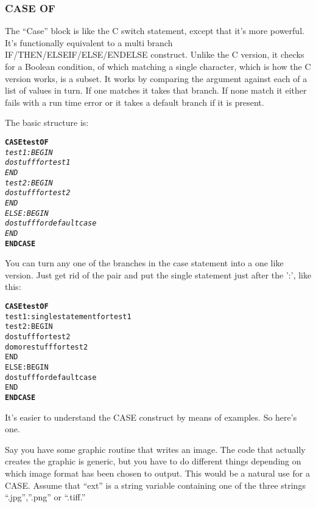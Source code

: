   \subsubsection{CASE OF}\label{sec:qs-Case-Of}

        The ``Case'' block is like the C switch statement, except that
        it's more powerful. It's functionally equivalent to a multi
        branch IF/THEN/ELSEIF/ELSE/ENDELSE construct. Unlike the C
        version, it checks for a Boolean condition, of which matching
        a single character, which is how the C version works, is a
        subset. It works by comparing the argument against each of a
        list of values in turn. If one matches it takes that
        branch. If none match it either fails with a run time error or
        it takes a default branch if it is present.

        The basic structure is:


      \begin{alltt}

      \textbf{CASE test OF}
          \textit{test1: BEGIN}
             \textit{do stuff for test1}
          \textit{END}
          \textit{test2: BEGIN}
             \textit{do stuff for test2}
          \textit{END}
          \textit{ELSE: BEGIN}
            \textit{do stuff for default case}
          \textit{END} 
      \textbf{ENDCASE}

      \end{alltt}


        You can turn any one of the branches in the case statement
        into a one like version. Just get rid of the 
        pair and put the single statement just after the ':', like
        this:

\begin{alltt}
\textbf{CASE test OF}
  test1: single statement for test 1
  test2: BEGIN
    do stuff for test2
    do more stuff for test2
  END
  ELSE: BEGIN
    do stuff for default case
  END
\textbf{ENDCASE}
\end{alltt}

        It's easier to understand the CASE construct by means of
        examples. So here's one.

       Say you have some graphic routine that writes an image. The
       code that actually creates the graphic is generic, but you have
       to do different things depending on which image format has been
       chosen to output. This would be a natural use for a
        CASE. Assume that ``ext'' is a string variable containing one
        of the three strings ``.jpg'',''.png'' or ``.tiff.''

